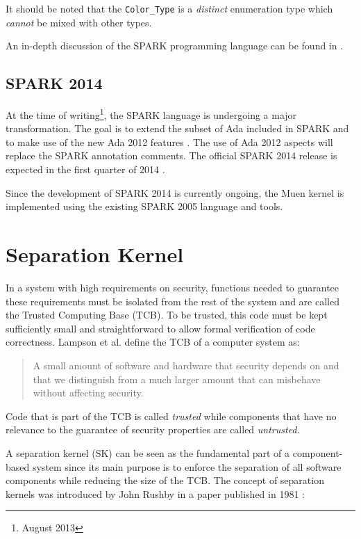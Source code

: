 It should be noted that the \texttt{Color\_Type} is a \emph{distinct}
enumeration type which \emph{cannot} be mixed with other types.

An in-depth discussion of the SPARK programming language can be found in
\cite{BarnesSPARK}.

\subsection{SPARK 2014}
At the time of writing\footnote{August 2013}, the SPARK language is undergoing
a major transformation. The goal is to extend the subset of Ada included in
SPARK and to make use of the new Ada 2012 features \cite{Ada2012}. The use of
Ada 2012 aspects will replace the SPARK annotation comments. The official SPARK
2014 release is expected in the first quarter of 2014
\cite{SPARK2014:Announcement}.

Since the development of SPARK 2014 is currently ongoing, the Muen kernel is
implemented using the existing SPARK 2005 language and tools.




\section{Separation Kernel}
In a system with high requirements on security, functions needed to guarantee
these requirements must be isolated from the rest of the system and are called
the Trusted Computing Base (TCB). To be trusted, this code must be
kept sufficiently small and straightforward to allow formal verification of code
correctness. Lampson et al. \cite{Lampson:1991:ADS:121133.121160} define the TCB
of a computer system as:
\begin{quote}
	A small amount of software and hardware that security depends on and
	that we distinguish from a much larger amount that can misbehave without
	affecting security.
\end{quote}

Code that is part of the TCB is called \emph{trusted} while components that have
no relevance to the guarantee of security properties are called \emph{untrusted}.

A separation kernel (SK) can be seen as the
fundamental part of a component-based system since its main purpose is to
enforce the separation of all software components while reducing the size of
the TCB. The concept of separation kernels was introduced by John Rushby in a
paper published in 1981 \cite{rushby1981}:

